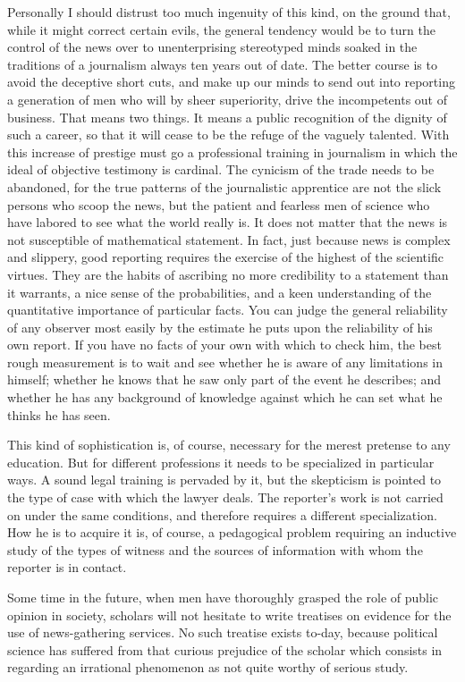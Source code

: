 \documentclass[openany,nobib,nohyper]{tufte-book}
\begin{document}
Personally I should distrust too much ingenuity of this kind, on the
ground that, while it might correct certain evils, the general tendency
would be to turn the control of the news over to unenterprising
stereotyped minds soaked in the traditions of a journalism always ten
years out of date. The better course is to avoid the deceptive short
cuts, and make up our minds to send out into reporting a generation of
men who will by sheer superiority, drive the incompetents out of
business. That means two things. It means a public recognition of the
dignity of such a career, so that it will cease to be the refuge of the
vaguely talented. With this increase of prestige must go a professional
training in journalism in which the ideal of objective testimony is
cardinal. The cynicism of the trade needs to be abandoned, for the true
patterns of the journalistic apprentice are not the slick persons who
scoop the news, but the patient and fearless men of science who have
labored to see what the world really is. It does not matter that the
news is not susceptible of mathematical statement. In fact, just because
news is complex and slippery, good reporting requires the exercise of
the highest of the scientific virtues. They are the habits of ascribing
no more credibility to a statement than it warrants, a nice sense of the
probabilities, and a keen understanding of the quantitative importance
of particular facts. You can judge the general reliability of any
observer most easily by the estimate he puts upon the reliability of his
own report. If you have no facts of your own with which to check him,
the best rough measurement is to wait and see whether he is aware of any
limitations in himself; whether he knows that he saw only part of the
event he describes; and whether he has any background of knowledge
against which he can set what he thinks he has seen.

This kind of sophistication is, of course, necessary for the merest
pretense to any education. But for different professions it needs to be
specialized in particular ways. A sound legal training is pervaded by
it, but the skepticism is pointed to the type of case with which the
lawyer deals. The reporter's work is not carried on under the same
conditions, and therefore requires a different specialization. How he is
to acquire it is, of course, a pedagogical problem requiring an
inductive study of the types of witness and the sources of information
with whom the reporter is in contact.

Some time in the future, when men have thoroughly grasped the role of
public opinion in society, scholars will not hesitate to write treatises
on evidence for the use of news-gathering services. No such treatise
exists to-day, because political science has suffered from that curious
prejudice of the scholar which consists in regarding an irrational
phenomenon as not quite worthy of serious study.
\end{document}
